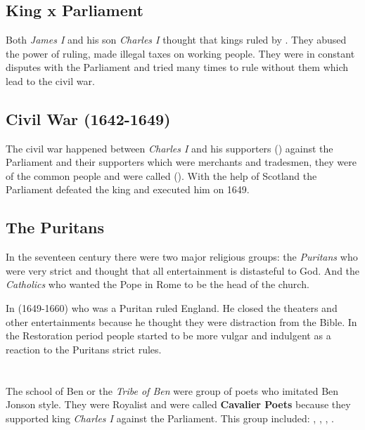 \documentclass[12pt, a4paper]{article}
\begin{document}
\section*{}
\subsection*{King x Parliament}

Both \textit{James I} and his son \textit{Charles I} thought that kings ruled 
by . They abused the power of ruling, made illegal taxes
on working people. They were in constant disputes with the Parliament and tried 
many times to rule without them which lead to the civil war.

\subsection*{Civil War (1642-1649)}

The civil war happened between \textit{Charles I} and his supporters 
() against the Parliament and their supporters which were
merchants and tradesmen, they were of the common people and were called (). 
With the help of Scotland the Parliament defeated the king and executed him on 1649.

\subsection*{The Puritans}

In the seventeen century there were two major religious groups: the
\textit{Puritans} who were very strict and thought that all entertainment is
distasteful to God. And the \textit{Catholics} who wanted the Pope in Rome to 
be the head of the church.\medbreak

In (1649-1660)  who was a Puritan ruled England. He closed the 
theaters and other entertainments because he thought they were distraction
from the Bible. In the Restoration period people started to be more vulgar and 
indulgent as a reaction to the Puritans strict rules.


\section*{}

The school of Ben or the \textit{Tribe of Ben} were group of poets who imitated
Ben Jonson style. They were Royalist and were called \textbf{Cavalier Poets} because they
supported king \textit{Charles I} against the Parliament. This group included: 
, , 
, .
\end{document}
